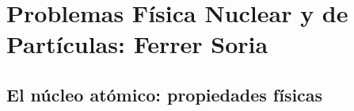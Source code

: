 
\chapter{Problemas Física Nuclear y de Partículas: Ferrer Soria}
\label{chap:problemas_ferrer_soria}


\section{El núcleo atómico: propiedades físicas}

